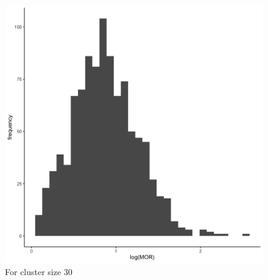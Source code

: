 \documentclass[
  letterpaper,
  DIV=11,
  numbers=noendperiod,
  titlepage]{scrartcl}
\begin{document}
\begin{figure}
\begin{minipage}[t]{0.50\linewidth}
{{\includegraphics{../../plots/two-lvl-ran-slope/high-prev/hist_10_30_two_lvl_slp_high_prev.png}

}

\caption{For cluster size 30}

}

\end{minipage}%
%
\begin{minipage}[t]{0.50\linewidth}

{\centering 

}
\end{minipage}
\end{figure}
\end{document}
